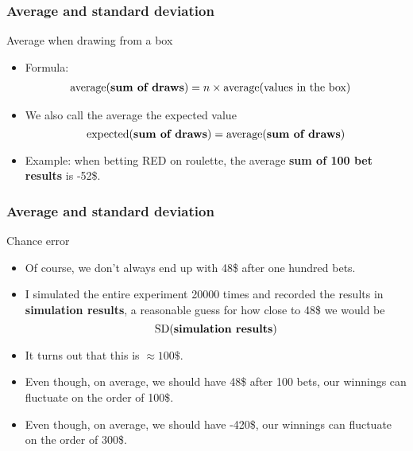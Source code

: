 \documentclass[handout]{beamer}
\begin{document}
   \begin{frame} \frametitle{Average and standard deviation}

   \begin{block}
   {Average when drawing from a box}
   \begin{itemize}
     \item Formula:
   $$
   \begin{aligned}
     \text{average({\bf sum of draws})}
     &= n \times \text{average(values in the box)}
   \end{aligned}
   $$
   \item We also call the average the expected value
     $$
     \text{expected({\bf sum of draws})} = \text{average({\bf sum of draws})}
     $$
   \item Example: when betting {\color{red} RED} on roulette, the average
   {\bf sum of 100 bet results} is -52\$.

   \end{itemize}
   \end{block}
   \end{frame}


   \begin{frame} \frametitle{Average and standard deviation}

   \begin{block}
   {Chance error}
   \begin{itemize}
   \item Of course, we don't always end up with 48\$ after one hundred bets.
   \item I simulated the entire experiment 20000 times and recorded the results
   in {\bf simulation results},
   a reasonable guess for how close to 48\$ we would be
   $$
   \text{SD({\bf simulation results})}
   $$
   \item It turns out that this is $\approx 100 \$ $.

   \item Even though, on average, we should have 48\$ after 100 bets, our winnings
   can fluctuate on the order of 100\$.

   \item Even though, on average, we should have -420\$, our winnings
   can fluctuate on the order of 300\$.

   \end{itemize}
   \end{block}
   \end{frame}
\end{document}
